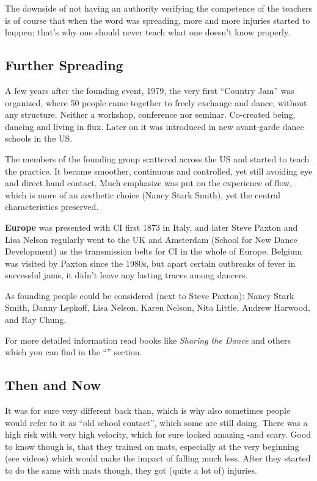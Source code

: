The downside of not having an authority verifying the competence of the teachers is of course that when the word was spreading, more and more injuries started to happen;
that's why one should never teach what one doesn't know properly.

\subsection{Further Spreading}\label{subsec:further-spreading}

A few years after the founding event, 1979, the very first ``Country Jam'' was organized, where 50 people came together to freely exchange and dance, without any structure.
Neither a workshop, conference nor seminar.
Co-created being, dancing and living in flux.
Later on it was introduced in new avant-garde dance schools in the US.

The members of the founding group scattered across the US and started to teach the practice.
It became smoother, continuous and controlled, yet still avoiding eye and direct hand contact.
Much emphasize was put on the experience of flow, which is more of an aesthetic choice (Nancy Stark Smith), yet the central characteristics preserved.

\textbf{Europe} was presented with CI first 1873 in Italy, and later Steve Paxton and Lisa Nelson regularly went to the UK and Amsterdam (School for New Dance Development) as the transmission belts for CI in the whole of Europe.
Belgium was visited by Paxton since the 1980s, but apart certain outbreaks of fever in successful jams, it didn't leave any lasting traces among dancers.

As founding people could be considered (next to Steve Paxton): Nancy Stark Smith, Danny Lepkoff, Lisa Nelson, Karen Nelson, Nita Little, Andrew Harwood, and Ray Chung.

For more detailed information read books like \textit{Sharing the Dance} and others which you can find in the ``'' section.

\subsection{Then and Now}\label{subsec:then-and-now}

It was for sure very different back than, which is why also sometimes people would refer to it as ``old school contact'', which some are still doing.
There was a high risk with very high velocity, which for sure looked amazing -and scary.
Good to know though is, that they trained on mats, especially at the very beginning (see videos) which would make the impact of falling much less.
After they started to do the same with mats though, they got (quite a lot of) injuries.

